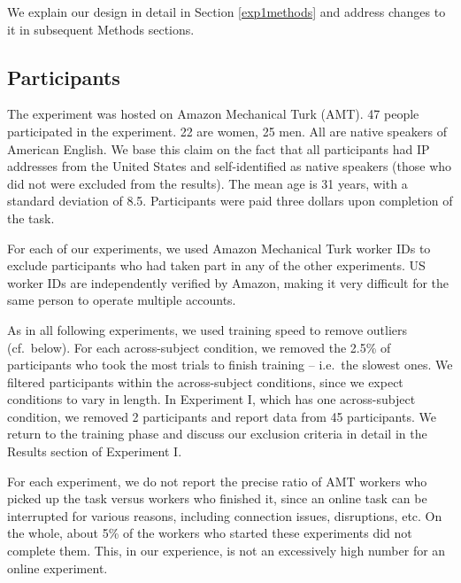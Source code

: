 \documentclass{frontiersSCNS} %
\begin{document}
We explain our design in detail in Section \ref{exp1methods} and address changes to it in subsequent Methods sections. 

\subsection{Participants}

The experiment was hosted on Amazon Mechanical Turk (AMT). 47 people participated in the experiment. 22 are women, 25 men. All are native speakers of American English. We base this claim on the fact that all participants had IP addresses from the United States and self-identified as native speakers (those who did not were excluded from the results). The mean age is 31 years, with a standard deviation of 8.5. Participants were paid three dollars upon completion of the task. 


For each of our experiments, we used Amazon Mechanical Turk worker IDs to exclude participants who had taken part in any of the other experiments. US worker IDs are independently verified by Amazon, making it very difficult for the same person to operate multiple accounts.


As in all following experiments, we used training speed to remove outliers (cf.\ below). For each across-subject condition, we removed the 2.5\% of participants who took the most trials to finish training -- i.e.\ the slowest ones. We filtered participants within the across-subject conditions, since we expect conditions to vary in length. In Experiment I, which has one across-subject condition, we removed 2 participants and report data from 45 participants. We return to the training phase and discuss our exclusion criteria in detail in the Results section of Experiment I.

For each experiment, we do not report the precise ratio of AMT workers who picked up the task versus workers who finished it, since an online task can be interrupted for various reasons, including connection issues, disruptions, etc. On the whole, about 5\% of the workers who started these experiments did not complete them. This, in our experience, is not an excessively high number for an online experiment.
\end{document}
